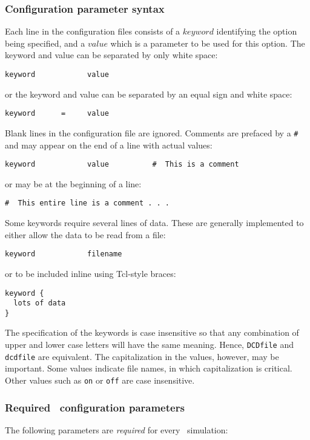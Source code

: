 \subsubsection{Configuration parameter syntax}
\label{section:configsyntax}
Each line
in the configuration files consists of a $keyword$ identifying the option
being specified, and a $value$ which is a parameter to be used for this
option.  The keyword and value can be separated by only white space:
\begin{verbatim}
keyword            value
\end{verbatim}
or the keyword and value can be separated by an equal sign and white space:
\begin{verbatim}
keyword      =     value
\end{verbatim}
Blank lines in the configuration file are ignored.  Comments are prefaced by
a \verb!#! and may appear on the end of a line with actual values:
\begin{verbatim}
keyword            value          #  This is a comment
\end{verbatim}
or may be at the beginning of a line:
\begin{verbatim}
#  This entire line is a comment . . . 
\end{verbatim}
Some keywords require several lines of data.
These are generally implemented to either allow the data to be read from a file:
\begin{verbatim}
keyword            filename
\end{verbatim}
or to be included inline using Tcl-style braces:
\begin{verbatim}
keyword {
  lots of data
}
\end{verbatim}

The specification of the keywords is case insensitive 
so that any combination of 
upper and lower case letters will have the same meaning.  
Hence, \verb!DCDfile! and \verb!dcdfile! 
are equivalent.  The capitalization in the values, however, may be important.
Some values indicate file names, in which capitalization is critical.  
Other values such as \verb!on! or \verb!off! are case insensitive.

\subsubsection{Required \NAMD\ configuration parameters}
\label{section:configparams}

The following parameters are {\em required} for every
\NAMD\ simulation:

